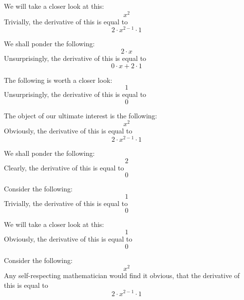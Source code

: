\documentclass{article}
\begin{document}
We will take a closer look at this:
\begin{equation}
x ^{2 } 
\end{equation}
Trivially, the derivative of this is equal to
\begin{equation}
2 \cdot x ^{2 - 1 } \cdot 1 
\end{equation}

We shall ponder the following:
\begin{equation}
2 \cdot x 
\end{equation}
Unsurprisingly, the derivative of this is equal to
\begin{equation}
0 \cdot x + 2 \cdot 1 
\end{equation}

The following is worth a closer look:
\begin{equation}
1 
\end{equation}
Unsurprisingly, the derivative of this is equal to
\begin{equation}
0 
\end{equation}

The object of our ultimate interest is the following:
\begin{equation}
x ^{2 } 
\end{equation}
Obviously, the derivative of this is equal to
\begin{equation}
2 \cdot x ^{2 - 1 } \cdot 1 
\end{equation}

We shall ponder the following:
\begin{equation}
2 
\end{equation}
Clearly, the derivative of this is equal to
\begin{equation}
0 
\end{equation}

Consider the following:
\begin{equation}
1 
\end{equation}
Trivially, the derivative of this is equal to
\begin{equation}
0 
\end{equation}

We will take a closer look at this:
\begin{equation}
1 
\end{equation}
Obviously, the derivative of this is equal to
\begin{equation}
0 
\end{equation}

Consider the following:
\begin{equation}
x ^{2 } 
\end{equation}
Any self-respecting mathematician would find it obvious, that the derivative of this is equal to
\begin{equation}
2 \cdot x ^{2 - 1 } \cdot 1 
\end{equation}
\end{document}
